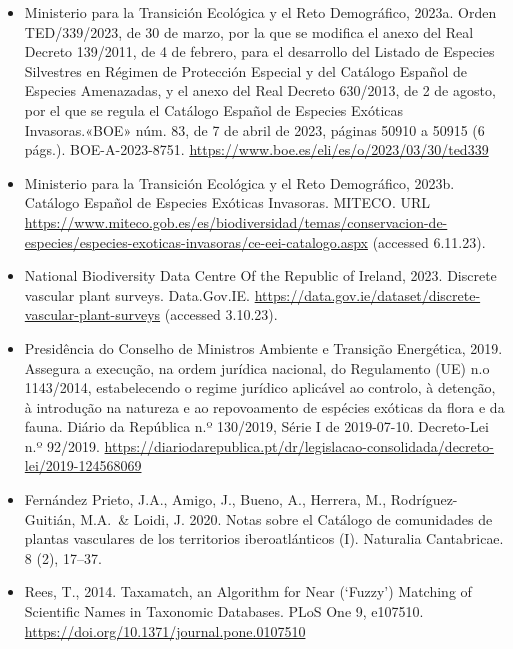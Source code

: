 \documentclass[
]{article}
\begin{document}
\begin{itemize}
  del Catálogo Español de Especies Amenazadas, y el Anexo del Real
  Decreto 630/2013, de 2 de agosto, por el que se regula el Catálogo
  Español de Especies Exóticas Invasoras. BOE-A-2020-15296. «BOE» núm.
  314, de 1 de diciembre de 2020, páginas 108167 a 108171 (5 págs.).
  \url{https://www.boe.es/eli/es/o/2020/11/20/ted1126}
\item
  Ministerio para la Transición Ecológica y el Reto Demográfico, 2023a.
  Orden TED/339/2023, de 30 de marzo, por la que se modifica el anexo
  del Real Decreto 139/2011, de 4 de febrero, para el desarrollo del
  Listado de Especies Silvestres en Régimen de Protección Especial y del
  Catálogo Español de Especies Amenazadas, y el anexo del Real Decreto
  630/2013, de 2 de agosto, por el que se regula el Catálogo Español de
  Especies Exóticas Invasoras.«BOE» núm. 83, de 7 de abril de 2023,
  páginas 50910 a 50915 (6 págs.). BOE-A-2023-8751.
  \url{https://www.boe.es/eli/es/o/2023/03/30/ted339}
\item
  Ministerio para la Transición Ecológica y el Reto Demográfico, 2023b.
  Catálogo Español de Especies Exóticas Invasoras. MITECO. URL
  \url{https://www.miteco.gob.es/es/biodiversidad/temas/conservacion-de-especies/especies-exoticas-invasoras/ce-eei-catalogo.aspx}
  (accessed 6.11.23).
\item
  National Biodiversity Data Centre Of the Republic of Ireland, 2023.
  Discrete vascular plant surveys. Data.Gov.IE.
  \url{https://data.gov.ie/dataset/discrete-vascular-plant-surveys}
  (accessed 3.10.23).
\item
  Presidência do Conselho de Ministros Ambiente e Transição Energética,
  2019. Assegura a execução, na ordem jurídica nacional, do Regulamento
  (UE) n.o 1143/2014, estabelecendo o regime jurídico aplicável ao
  controlo, à detenção, à introdução na natureza e ao repovoamento de
  espécies exóticas da flora e da fauna. Diário da República n.º
  130/2019, Série I de 2019-07-10. Decreto-Lei n.º 92/2019.
  \url{https://diariodarepublica.pt/dr/legislacao-consolidada/decreto-lei/2019-124568069}
\item
  Fernández Prieto, J.A., Amigo, J., Bueno, A., Herrera, M.,
  Rodríguez-Guitián, M.A.~\& Loidi, J. 2020. Notas sobre el Catálogo de
  comunidades de plantas vasculares de los territorios iberoatlánticos
  (I). Naturalia Cantabricae. 8 (2), 17--37.
\item
  Rees, T., 2014. Taxamatch, an Algorithm for Near (`Fuzzy') Matching of
  Scientific Names in Taxonomic Databases. PLoS One 9, e107510.
  \url{https://doi.org/10.1371/journal.pone.0107510}

\end{itemize}
\end{document}
